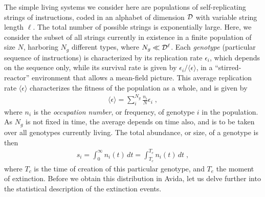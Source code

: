 \documentclass[letterpaper]{article}
\begin{document}
The simple living systems we consider here are populations of
self-replicating strings of instructions, coded in an alphabet of
dimension ${\cal D}$ with variable string length $\ell$. The total
number of possible strings is exponentially large. Here, we consider
the subset of all strings currently in existence in a finite
population of size $N$, harboring $N_g$ different types, where
$N_g\ll{\cal D}^\ell$. Each {\em genotype} (particular sequence of
instructions) is characterized by its replication rate $\epsilon_i$,
which depends on the sequence only, while its survival rate is given
by $\epsilon_i/\langle \epsilon\rangle$, in a ``stirred-reactor''
environment that allows a mean-field picture. This average replication
rate $\langle \epsilon\rangle$ characterizes the fitness of the
population as a whole, and is given by
\begin{eqnarray}
\langle \epsilon\rangle=\sum_i^{N_g}\frac{n_i}N \epsilon_i\;,
\end{eqnarray}
where $n_i$ is the {\em occupation number}, or frequency, of genotype
$i$ in the population. As $N_g$ is not fixed in time, the average
depends on time also, and is to be taken over all genotypes currently
living. The total abundance, or size, of a genotype is then
\begin{eqnarray}
s_i=\int_0^\infty n_i(t)\, dt=\int_{T_c}^{T_e}n_i(t)\, dt\;,
\label{size}
\end{eqnarray}
where $T_c$ is the time of creation of this particular genotype, and
$T_e$ the moment of extinction. Before we obtain this distribution in
Avida, let us delve further into the statistical description of the
extinction events.
\end{document}

